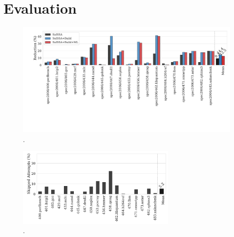 \section{Evaluation}





\begin{figure}[h]
  \centering
  \includegraphics[width=\textwidth]{figs/code-size-reduction.pdf}
  \vspace{-2.5em}
  \caption{.}
  \label{fig:code-size-reduction}
\end{figure}


\begin{figure}[h]
  \centering
  \includegraphics[width=0.7\textwidth]{figs/skipped-attempts.pdf}
  \vspace{-2.5em}
  \caption{.}
  \label{fig:skipped-attempts}
\end{figure}

